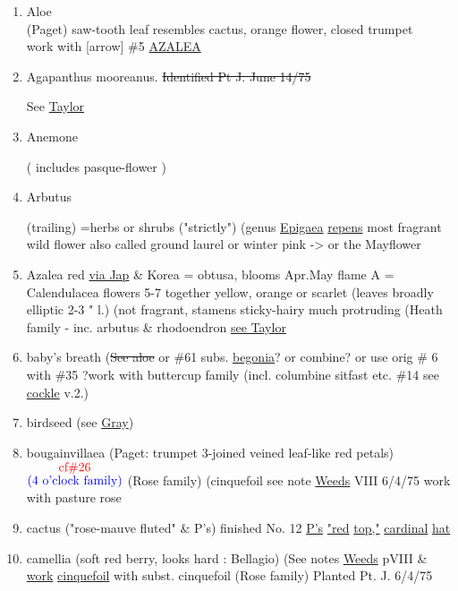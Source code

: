 \documentclass[a4paper,9pt]{article}
\begin{document}
\begin{enumerate}
\color{black}
\item Aloe\\
(Paget) saw-tooth leaf resembles cactus,
orange flower, closed trumpet\\
\color{red}
work with [arrow]
\#5 
\ul{AZALEA}
\color{black}
\item \color{red} 
\color{red}
\small
{}\par
Agapanthus mooreanus. \sout{Identified Pt J. June 14/75}\par
See \ul{Taylor}
\normalsize
\color{black}
\item Anemone
\color{red}
\small
{}%
		\par
\normalsize
\color{red}(
\color{black}
includes pasque-flower
\color{red})\\
\color{black}
\item Arbutus
\color{blue}
\small
{}\par
\normalsize
\color{black} 
(trailing)
\color{blue}
=herbs
or shrubs ("strictly") (genus \ul{Epigaea}
\ul{repens}
most fragrant wild flower 
also called ground
laurel or winter pink -> or the Mayflower

\color{black}
\item Azalea
\color{red}
red \ul{via Jap} \color{blue} \& Korea 
\color{red}= obtusa,
blooms Apr.May
flame A = Calendulacea flowers 5-7 together yellow, orange
or scarlet (leaves broadly elliptic 2-3 " l.) (not fragrant, stamens
sticky-hairy much protruding
(Heath family - inc. arbutus \& 
rhodoendron \ul{see Taylor}
\color{black}
\item baby's breath 
\color{red}
(\sout{See aloe}
or \#61
subs. \ul{begonia}? or combine? or use orig \# 6 with \#35
\color{black}
?work with buttercup family 
(incl. columbine 
sitfast etc. 
\color{red}\#14
\color{black}
see \ul{cockle} v.2.)
\item birdseed (see \ul{Gray})


\item bougainvillaea (Paget: trumpet 3-joined
veined leaf-like red petals) {$\stackrel{\hbox{\color{red}{cf\#26}}}{\hbox{\color{blue}{(4 o'clock family)}}}$}
\color{red}
(Rose family) (cinquefoil see note \ul{Weeds} VIII 6/4/75 work with 
pasture rose
\color{black}
\item cactus ("rose-mauve fluted" \& P's)
\color{blue}
finished 
No. 12
\ul{P's} \ul{"red} \ul{top,"} \ul{cardinal} \ul{hat}
\color{black}
\item camellia (soft red berry, looks hard : Bellagio)
(See notes \ul{Weeds} 
pVIII \& \ul{work} \ul{cinquefoil} with %
subst. cinquefoil (Rose family) Planted Pt. J. 6/4/75


\end{enumerate}
\end{document}
